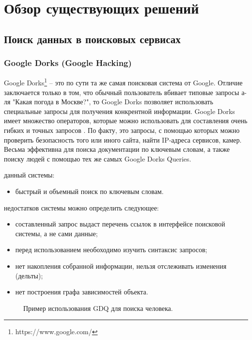 \section{Обзор существующих решений}
\label{sec:Chapter2} 
\subsection{Поиск данных в поисковых сервисах}
\subsubsection{Google Dorks (Google Hacking)}
Google Dorks\footnote{https://www.google.com/} -- это по сути та же самая поисковая система от Google. Отличие заключается
только в том, что обычный пользователь вбивает типовые запросы а-ля "Какая погода в Москве?", то Google Dorks позволяет
использовать специальные запросы для получения конкрентной информации. Google Dorks имеет множество операторов, которые 
можно использовать для составления очень гибких и точных запросов \cite{googleHackingWikipedia}. По факту, это запросы, с помощью которых можно проверить
безопасность того или иного сайта, найти IP-адреса сервисов, камер. Весьма эффективна для поиска документации по ключевым словам, 
а также поиску людей с помощью тех же самых Google Dorks Queries. 

 данный системы:
\begin{itemize}
    \item быстрый и объемный поиск по ключевым словам.
\end{itemize}

 недостатков системы можно определить следующее:
\begin{itemize}
    \item составленный запрос выдаст перечень ссылок в интерфейсе поисковой системы, а не сами данные;
    \item перед использованием необоходимо изучить синтаксис запросов;
    \item нет накопления собранной информации, нельзя отслеживать изменения (дельты);
    \item нет построения графа зависимостей объекта.
\end{itemize}

\begin{figure}[H]
    \caption{Пример использования GDQ для поиска человека.}
    \label{ris:image}
\end{figure}

